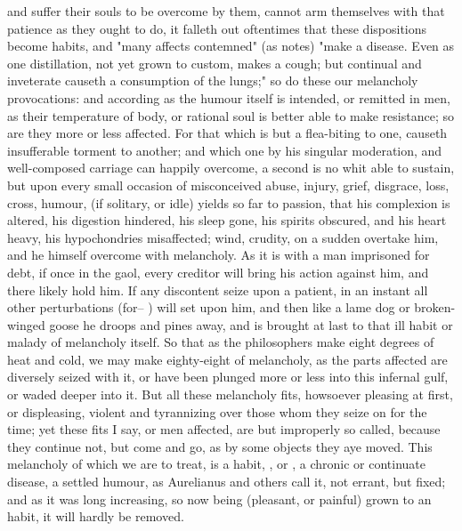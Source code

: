 and suffer their souls to be overcome by them, cannot arm themselves with that
patience as they ought to do, it falleth out oftentimes that these dispositions
become habits, and "many affects contemned" (as \Seneca{}
notes) "make a disease. Even as one distillation, not yet grown to custom,
makes a cough; but continual and inveterate causeth a consumption of the
lungs;" so do these our melancholy provocations: and according as the humour
itself is intended, or remitted in men, as their temperature of body, or
rational soul is better able to make resistance; so are they more or less
affected. For that which is but a flea-biting to one, causeth insufferable
torment to another; and which one by his singular moderation, and well-composed
carriage can happily overcome, a second is no whit able to sustain, but upon
every small occasion of misconceived abuse, injury, grief, disgrace, loss,
cross, humour, \etc{} (if solitary, or idle) yields so far to passion, that his
complexion is altered, his digestion hindered, his sleep gone, his spirits
obscured, and his heart heavy, his hypochondries misaffected; wind, crudity, on
a sudden overtake him, and he himself overcome with melancholy. As it is with a
man imprisoned for debt, if once in the gaol, every creditor will bring his
action against him, and there likely hold him. If any discontent seize upon a
patient, in an instant all other perturbations (for-- ) will set upon him, and then like a lame dog or broken-winged goose he
droops and pines away, and is brought at last to that ill habit or malady of
melancholy itself. So that as the philosophers make eight
degrees of heat and cold, we may make eighty-eight of melancholy, as the parts
affected are diversely seized with it, or have been plunged more or less into
this infernal gulf, or waded deeper into it. But all these melancholy fits,
howsoever pleasing at first, or displeasing, violent and tyrannizing over those
whom they seize on for the time; yet these fits I say, or men affected, are but
improperly so called, because they continue not, but come and go, as by some
objects they aye moved. This melancholy of which we are to treat, is a habit,
, or , a chronic or continuate disease, a
settled humour, as Aurelianus and
others call it, not errant, but fixed; and as it was long
increasing, so now being (pleasant, or painful) grown to an habit, it will
hardly be removed.



